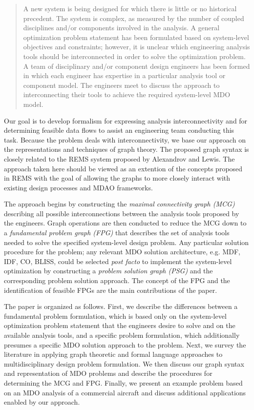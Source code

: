     \begin{quote}
    A new system is being designed for which there is little or no historical precedent. The system
    is complex, as measured by the number of coupled disciplines and/or components involved in the
    analysis. A general optimization problem statement has been formulated based on system-level objectives and constraints; however, it is unclear which engineering analysis tools should
    be interconnected in order to solve the optimization problem. A team of disciplinary and/or component design engineers has been formed in which each engineer has expertise in a
    particular analysis tool or component model. The engineers meet to discuss the approach to
    interconnecting their tools to achieve the required system-level MDO model.
    \end{quote}

    Our goal is to develop formalism for expressing analysis interconnectivity and for determining feasible
    data flows to assist an engineering team conducting this task. Because the problem deals with
    interconnectivity, we base our approach on the representations and techniques of graph theory. The 
    proposed graph syntax is closely related to the REMS system proposed by 
    Alexandrov and Lewis\cite{alexandrov2004}. The approach taken here should be viewed as an extention 
    of the concepts proposed in REMS with the goal of allowing the graphs to more closely interact with 
    existing design processes and MDAO frameworks. 

The approach begins by 
    constructing the \emph{maximal connectivity graph (MCG)} describing all possible
    interconnections between the analysis tools proposed by the engineers. Graph operations are then
    conducted to reduce the MCG down to a \emph{fundamental problem graph (FPG)} that describes the set of analysis
    tools needed to solve the specified system-level design problem.
    Any particular solution procedure for the problem; any relevant MDO solution architecture, e.g. MDF,
    IDF, CO, BLISS, could be selected \emph{post facto} to implement the system-level optimization by
    constructing a \emph{problem solution graph (PSG)} and the corresponding problem solution approach.
    The concept of the FPG and the identification of feasible FPGs are the main contributions of the paper.

    The paper is organized as follows. First, we describe the differences between a fundamental problem
    formulation, which is based only on the system-level optimization problem statement that the
    engineers desire to solve and on the available analysis tools, and a specific problem formulation, which
    additionally presumes a specific MDO solution approach to the problem. Next, we survey the literature in applying
    graph theoretic and formal language approaches to multidisciplinary design problem formulation. 
    We then discuss our graph syntax and representation of MDO problems and describe the procedures for 
    determining the MCG and FPG. Finally, we present an example problem based on an MDO analysis of a 
    commercial aircraft and discuss additional applications enabled by our approach.

